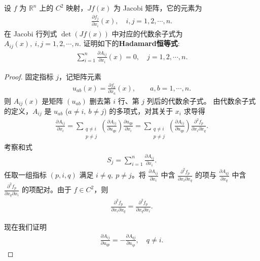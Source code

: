 \documentclass[../../main.tex]{subfiles}%
\begin{document}
\begin{example}
设 $f$ 为 $\mathbb{R}^n$ 上的 $C^2$ 映射，$Jf(x)$ 为 Jacobi 矩阵，它的元素为
\begin{align*}
\frac{\partial f_j}{\partial x_i}(x),\quad i,j=1,2,\cdots,n.
\end{align*}
在 Jacobi 行列式 $\det(Jf(x))$ 中对应的代数余子式为 $A_{ij}(x),\ i,j=1,2,\cdots,n.$ 证明如下的\textbf{Hadamard恒等式}:
\begin{align}
\sum_{i=1}^n \frac{\partial A_{ij}}{\partial x_i}(x)=0,\quad j=1,2,\cdots,n. \label{eq:hadamard_main}
\end{align}
\end{example}
\begin{proof}
固定指标 $j$，记矩阵元素
\begin{align*}
u_{ab}(x)=\frac{\partial f_b}{\partial x_a}(x),\qquad a,b=1,\cdots,n.
\end{align*}
则 $A_{ij}(x)$ 是矩阵 $(u_{ab})$ 删去第 $i$ 行、第 $j$ 列后的代数余子式。
由代数余子式的定义，$A_{ij}$ 是 $u_{ab}$ ($a\ne i,\ b\ne j$) 的多项式，对其关于 $x_i$ 求导得
\begin{align}
\frac{\partial A_{ij}}{\partial x_i}
=
\sum_{\substack{q\ne i\\ p\ne j}}
\left(\frac{\partial A_{ij}}{\partial u_{qp}}\right)
\frac{\partial u_{qp}}{\partial x_i}
=
\sum_{\substack{q\ne i\\ p\ne j}}
\left(\frac{\partial A_{ij}}{\partial u_{qp}}\right)
\frac{\partial^2 f_p}{\partial x_i\partial x_q}. \label{eq:derivative_expand}
\end{align}
考察和式
\begin{align}\label{eq::jijwiIIJIJww}
S_j=\sum_{i=1}^n \frac{\partial A_{ij}}{\partial x_i}.
\end{align}
任取一组指标 $(p,i,q)$ 满足 $i\ne q,\ p\ne j$。将 $\frac{\partial A_{ij}}{\partial x_i}$ 中含 $\frac{\partial^2 f_p}{\partial x_i\partial x_q}$ 的项与 $\frac{\partial A_{qj}}{\partial x_q}$ 中含 $\frac{\partial^2 f_p}{\partial x_q\partial x_i}$ 的项配对。由于 $f\in C^2$，则
\begin{align*}
\frac{\partial^2 f_p}{\partial x_i\partial x_q}
=
\frac{\partial^2 f_p}{\partial x_q\partial x_i}.
\end{align*}

现在我们证明
\begin{align}
\frac{\partial A_{ij}}{\partial u_{qp}}
=
-\frac{\partial A_{qj}}{\partial u_{ip}},\quad q\neq i. \label{eq:cofactor_relation}
\end{align}


\end{proof}
\end{document}
